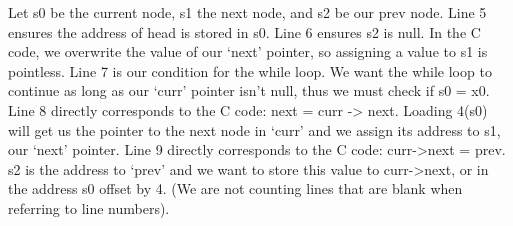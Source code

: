\begin{blocksection}
\begin{solution}
Let s0 be the current node, s1 the next node, and s2 be our prev node. Line 5 ensures the address of head is stored in s0. Line 6 ensures s2 is null. In the C code, we overwrite the value of our ‘next’ pointer, so assigning a value to s1 is pointless. Line 7 is our condition for the while loop. We want the while loop to continue as long as our ‘curr’ pointer isn’t null, thus we must check if s0 = x0. Line 8 directly corresponds to the C code: next = curr -> next. Loading 4(s0) will get us the pointer to the next node in ‘curr’ and we assign its address to s1, our ‘next’ pointer. Line 9 directly corresponds to the C code: curr->next = prev. s2 is the address to ‘prev’ and we want to store this value to curr->next, or in the address s0 offset by 4.  (We are not counting lines that are blank when referring to line numbers).

\end{solution}
\end{blocksection}